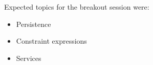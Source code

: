 Expected topics for the breakout session were:

\begin{itemize}
   \item Persistence
   \item Constraint expressions
   \item Services
\end{itemize}

%
%
%
%
%
